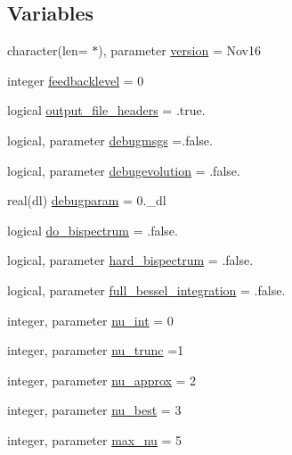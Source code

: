 \subsection*{Variables}
\begin{DoxyCompactItemize}
\item 
character(len= $\ast$), parameter \mbox{\hyperlink{namespacemodelparams_ae4691876bb5eed2cdd64ae8eca39dc32}{version}} = \textquotesingle{}Nov16\textquotesingle{}
\item 
integer \mbox{\hyperlink{namespacemodelparams_a403353ede075646b189fcfbae0fb3396}{feedbacklevel}} = 0
\item 
logical \mbox{\hyperlink{namespacemodelparams_aa59993fb52b4f0010f0587e10f27b792}{output\+\_\+file\+\_\+headers}} = .true.
\item 
logical, parameter \mbox{\hyperlink{namespacemodelparams_a2fccc38c501c6f494fa1ced55e52a983}{debugmsgs}} =.false.
\item 
logical, parameter \mbox{\hyperlink{namespacemodelparams_a69b1cd59448404e0bcd21612fb8e69c9}{debugevolution}} = .false.
\item 
real(dl) \mbox{\hyperlink{namespacemodelparams_a35a694469321a4414b622d9a0ec18f1f}{debugparam}} = 0.\+\_\+dl
\item 
logical \mbox{\hyperlink{namespacemodelparams_aa42e1180e92882f566f30d970dc110a4}{do\+\_\+bispectrum}} = .false.
\item 
logical, parameter \mbox{\hyperlink{namespacemodelparams_a0dda4d3f4b77e14c2635221cdf01de0f}{hard\+\_\+bispectrum}} = .false.
\item 
logical, parameter \mbox{\hyperlink{namespacemodelparams_a62664016ce9ca8fc8e53ebbfb8caa09c}{full\+\_\+bessel\+\_\+integration}} = .false.
\item 
integer, parameter \mbox{\hyperlink{namespacemodelparams_a6886b2553f1b2657b012618d5377619d}{nu\+\_\+int}} = 0
\item 
integer, parameter \mbox{\hyperlink{namespacemodelparams_a31f4e37e9eb0841e803020950fe2ce52}{nu\+\_\+trunc}} =1
\item 
integer, parameter \mbox{\hyperlink{namespacemodelparams_ac509ce908abffae5d206533cc7eddfe9}{nu\+\_\+approx}} = 2
\item 
integer, parameter \mbox{\hyperlink{namespacemodelparams_a1da306d0a7758bf910362b6d62e6658f}{nu\+\_\+best}} = 3
\item 
integer, parameter \mbox{\hyperlink{namespacemodelparams_a5e3667fcd2aae0fb15654c207fc6830e}{max\+\_\+nu}} = 5
\item 

\end{DoxyCompactItemize}
